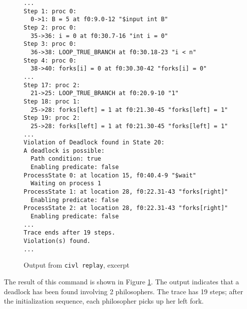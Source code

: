 \begin{figure}
  \begin{small}
\begin{verbatim}
...
Step 1: proc 0: 
  0->1: B = 5 at f0:9.0-12 "$input int B"
Step 2: proc 0: 
  35->36: i = 0 at f0:30.7-16 "int i = 0"
Step 3: proc 0: 
  36->38: LOOP_TRUE_BRANCH at f0:30.18-23 "i < n"
Step 4: proc 0: 
  38->40: forks[i] = 0 at f0:30.30-42 "forks[i] = 0"
...
Step 17: proc 2: 
  21->25: LOOP_TRUE_BRANCH at f0:20.9-10 "1"
Step 18: proc 1: 
  25->28: forks[left] = 1 at f0:21.30-45 "forks[left] = 1"
Step 19: proc 2: 
  25->28: forks[left] = 1 at f0:21.30-45 "forks[left] = 1"
...
Violation of Deadlock found in State 20:
A deadlock is possible:
  Path condition: true
  Enabling predicate: false
ProcessState 0: at location 15, f0:40.4-9 "$wait"
  Waiting on process 1
ProcessState 1: at location 28, f0:22.31-43 "forks[right]"
  Enabling predicate: false
ProcessState 2: at location 28, f0:22.31-43 "forks[right]"
  Enabling predicate: false
...
Trace ends after 19 steps.
Violation(s) found.
...
\end{verbatim}
  \end{small}
  \caption{Output from \texttt{civl replay}, excerpt}
  \label{fig:diningReplay}
\end{figure}

The result of this command is shown in Figure \ref{fig:diningReplay}.
The output indicates that a deadlock has been found involving 2
philosophers. The trace has 19 steps; after the initialization
sequence, each philosopher picks up her left fork.

